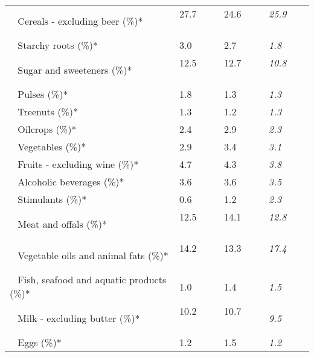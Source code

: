 \begin{tabular}{L{3.9cm} R{1cm} R{1cm} R{1cm}}
	 ~ Cereals - excluding beer (\%)* & 27.7 ~ \ \ & 24.6 ~ \ \ & \textit{25.9} ~ \ \ \\ 
	 ~ Starchy roots (\%)* & 3.0 ~ \ \ & 2.7 ~ \ \ & \textit{1.8} ~ \ \ \\ 
	 ~ Sugar and sweeteners (\%)* & 12.5 ~ \ \ & 12.7 ~ \ \ & \textit{10.8} ~ \ \ \\ 
	 ~ Pulses (\%)* & 1.8 ~ \ \ & 1.3 ~ \ \ & \textit{1.3} ~ \ \ \\ 
	 ~ Treenuts (\%)* & 1.3 ~ \ \ & 1.2 ~ \ \ & \textit{1.3} ~ \ \ \\ 
	 ~ Oilcrops (\%)* & 2.4 ~ \ \ & 2.9 ~ \ \ & \textit{2.3} ~ \ \ \\ 
	 ~ Vegetables (\%)* & 2.9 ~ \ \ & 3.4 ~ \ \ & \textit{3.1} ~ \ \ \\ 
	 ~ Fruits - excluding wine (\%)* & 4.7 ~ \ \ & 4.3 ~ \ \ & \textit{3.8} ~ \ \ \\ 
	 ~ Alcoholic beverages (\%)* & 3.6 ~ \ \ & 3.6 ~ \ \ & \textit{3.5} ~ \ \ \\ 
	 ~ Stimulants (\%)* & 0.6 ~ \ \ & 1.2 ~ \ \ & \textit{2.3} ~ \ \ \\ 
	 ~ Meat and offals (\%)* & 12.5 ~ \ \ & 14.1 ~ \ \ & \textit{12.8} ~ \ \ \\ 
	 ~ Vegetable oils and animal fats (\%)* & 14.2 ~ \ \ & 13.3 ~ \ \ & \textit{17.4} ~ \ \ \\ 
	 ~ Fish, seafood and aquatic products (\%)* & 1.0 ~ \ \ & 1.4 ~ \ \ & \textit{1.5} ~ \ \ \\ 
	 ~ Milk - excluding butter (\%)* & 10.2 ~ \ \ & 10.7 ~ \ \ & \textit{9.5} ~ \ \ \\ 
	 ~ Eggs (\%)* & 1.2 ~ \ \ & 1.5 ~ \ \ & \textit{1.2} ~ \ \ \\ 
       \toprule
      \end{tabular}
      \clearpage
{}
